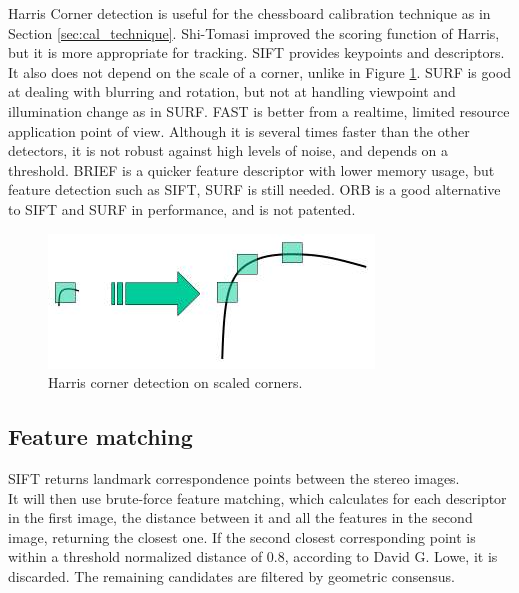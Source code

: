 Harris Corner detection is useful for the chessboard calibration technique as in Section \ref{sec:cal_technique}. Shi-Tomasi improved the scoring function of Harris, but it is more appropriate for tracking. SIFT provides keypoints and descriptors. It also does not depend on the scale of a corner, unlike in Figure \ref{fig:sift_scale}. SURF is good at dealing with blurring and rotation, but not at handling viewpoint and illumination change as in SURF. FAST is better from a realtime, limited resource application point of view. Although it is several times faster than the other detectors, it is not robust against high levels of noise, and depends on a threshold. BRIEF is a quicker feature descriptor with lower memory usage, but feature detection such as SIFT, SURF is still needed. ORB is a good alternative to SIFT and SURF in performance, and is not patented.\\

\begin{figure}[H]
\centering
\includegraphics[scale=0.5]{images/sift_scale_invariant.jpg}
\caption{Harris corner detection on scaled corners. \cite{calib3d}}
\label{fig:sift_scale}
\end{figure}

\subsection{Feature matching}

SIFT returns landmark correspondence points between the stereo images.\\

It will then use brute-force feature matching, which calculates for each descriptor in the first image, the distance between it and all the features in the second image, returning the closest one. If the second closest corresponding point is within a threshold normalized distance of 0.8, according to David G. Lowe, it is discarded. The remaining candidates are filtered by geometric consensus.\\


